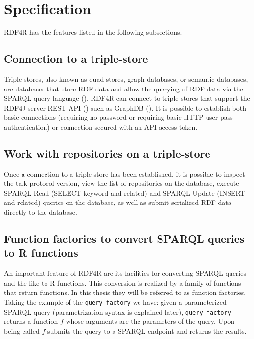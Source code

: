 \section{Specification}

RDF4R has the features listed in the following subsections.

\subsection{Connection to a triple-store}

Triple-stores, also known as quad-stores, graph databases, or semantic databases, are databases that store RDF data and allow the querying of RDF data via the SPARQL query language (\cite{the_w3c_sparql_working_group_sparql_2013}). RDF4R can connect to triple-stores that support the RDF4J server REST API (\cite{rdf4j_development_team_rdf4j_2017}) such as GraphDB (\cite{ontotext_graphdb_2018}). It is possible to establish both basic connections (requiring no password or requiring basic HTTP user-pass authentication) or connection secured with an API access token.

\subsection{Work with repositories on a triple-store}

Once a connection to a triple-store has been established, it is possible to inspect the talk protocol version, view the list of repositories on the database, execute SPARQL Read (SELECT keyword and related) and SPARQL Update (INSERT and related) queries on the database, as well as submit serialized RDF data directly to the database.

\subsection{Function factories to convert SPARQL queries to R functions}

An important feature of RDF4R are its facilities for converting SPARQL queries and the like to R functions. This conversion is realized by a family of functions that return functions. In this thesis they will be referred to as function factories. Taking the example of the {\tt query\_factory} we have: given a parameterized SPARQL query (parametrization syntax is explained later), {\tt query\_factory} returns a function $f$ whose arguments are the parameters of the query. Upon being called $f$ submits the query to a SPARQL endpoint and returns the results.

